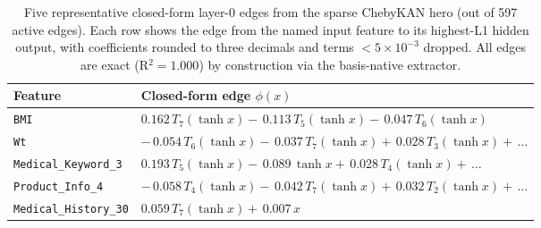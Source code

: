 \begin{table}[H]
\centering
\caption{Five representative closed-form layer-0 edges from the sparse ChebyKAN hero (out of 597 active edges). Each row shows the edge from the named input feature to its highest-L1 hidden output, with coefficients rounded to three decimals and terms $< 5 \times 10^{-3}$ dropped. All edges are exact (R$^2 = 1.000$) by construction via the basis-native extractor.}
\label{tab:closed_forms}
\footnotesize
\begin{tabular}{ll}
\hline
Feature & Closed-form edge $\phi(x)$ \\
\hline
\texttt{BMI} & $\displaystyle 0.162\,T_{7}(\tanh x) -\,0.113\,T_{5}(\tanh x) -\,0.047\,T_{6}(\tanh x)$ \\
\texttt{Wt} & $\displaystyle -\,0.054\,T_{6}(\tanh x) -\,0.037\,T_{7}(\tanh x) +\,0.028\,T_{3}(\tanh x) +\,\dots$ \\
\texttt{Medical\_Keyword\_3} & $\displaystyle 0.193\,T_{5}(\tanh x) -\,0.089\,\tanh x +\,0.028\,T_{4}(\tanh x) +\,\dots$ \\
\texttt{Product\_Info\_4} & $\displaystyle -\,0.058\,T_{4}(\tanh x) -\,0.042\,T_{7}(\tanh x) +\,0.032\,T_{2}(\tanh x) +\,\dots$ \\
\texttt{Medical\_History\_30} & $\displaystyle 0.059\,T_{7}(\tanh x) +\,0.007\,x$ \\
\hline
\end{tabular}
\end{table}